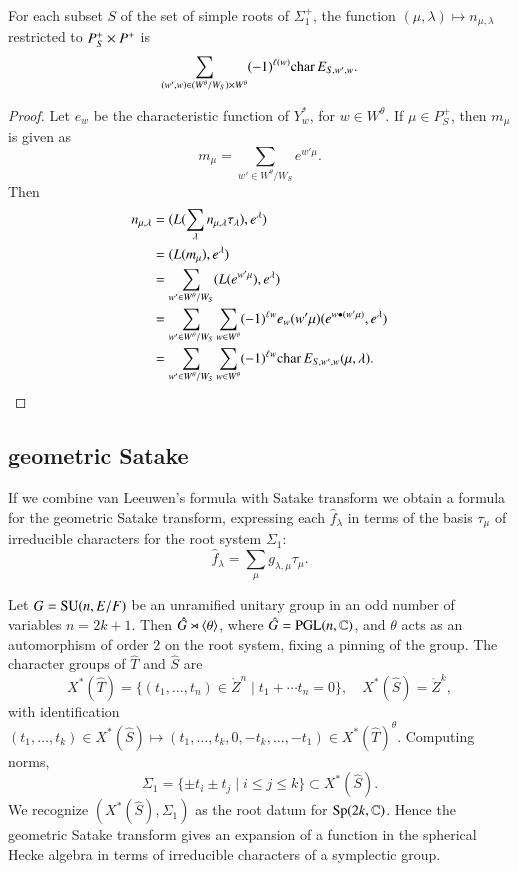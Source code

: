 \begin{lemma}  For each subset $S$ of the set of simple roots of $\Sigma^+_1$,
the function $(\mu,\lambda)\mapsto n_{\mu,\lambda}$ restricted
to $P^+_S\times P^+$ is 
\[
\sum_{(w',w)\in (W^\theta/W_S)\times W^\theta} (-1)^{\ell(w)} {\operatorname{char}}\, E_{S,w',w}.
\]
\end{lemma}

\begin{proof}  
Let $e_w$ be the characteristic function of $Y^*_w$, for $w\in W^\theta$.
If $\mu\in P^+_S$,
then $m_\mu$ is given
as 
\[
m_\mu = \sum_{w'\in W^\theta/W_S} e^{w' \mu}.
\]
Then
\begin{align*}
n_{\mu,\lambda} &= (L(\sum_{\lambda} n_{\mu,\lambda} \tau_\lambda),e^\lambda) \\
     &= (L(m_\mu),e^\lambda) \\
     &= \sum_{w'\in W^\theta/W_S} (L(e^{w'\mu}),e^\lambda)\\
     &= \sum_{w'\in W^\theta/W_S} \sum_{w\in W^\theta} (-1)^{\ell w} e_w(w'\mu) (e^{w\bullet (w'\mu)},e^\lambda)\\
     &= \sum_{w'\in W^\theta/W_S} \sum_{w\in W^\theta} (-1)^{\ell w} {\operatorname{char}}\, E_{S,w',w}(\mu,\lambda).
\end{align*}
\end{proof}

\subsection{geometric Satake}

If we combine van Leeuwen's formula with Satake transform we obtain a formula
for the geometric Satake transform, expressing each $\hat f_\lambda$ in terms of the basis $\tau_\mu$ of irreducible
characters for the root system $\Sigma_1$:
\begin{equation}\label{eqn:geometric-satake}
\hat f_\lambda = \sum_\mu g_{\lambda,\mu} \tau_\mu.
\end{equation}

\begin{example}  Let $G={\operatorname{SU}}(n,E/F)$ be an unramified unitary group in an odd number of variables $n=2k+1$.
Then $\hat G\rtimes \langle{\theta}\rangle$, where $\hat G = {\operatorname{PGL}}(n,\mathbb{C})$, and $\theta$ acts as an automorphism
of order $2$ on the root system, fixing a pinning of the group.
The character groups of $\hat T$ and $\hat S$ are
\[
X^*(\hat T) = \{(t_1,\ldots,t_{n})\in \ring{Z}^n\mid t_1+\cdots t_n=0\}, 
\quad
X^*(\hat S)  = \ring{Z}^k,
\]
with identification $(t_1,\ldots,t_k)\in X^*(\hat S)\mapsto (t_1,\ldots,t_k,0,-t_k,\ldots,-t_1)\in X^*(\hat T)^\theta$.
Computing norms,
\[
\Sigma_1 = \{\pm t_i\pm t_j\mid i\le j\le k\}\subset X^*(\hat S).
\]
We recognize $(X^*(\hat S),\Sigma_1)$ as the root datum for ${\operatorname{Sp}}(2k,\mathbb{C})$.  Hence
the geometric Satake transform gives an expansion of a function in the spherical Hecke algebra
in terms of irreducible characters of a symplectic group.
\end{example}

